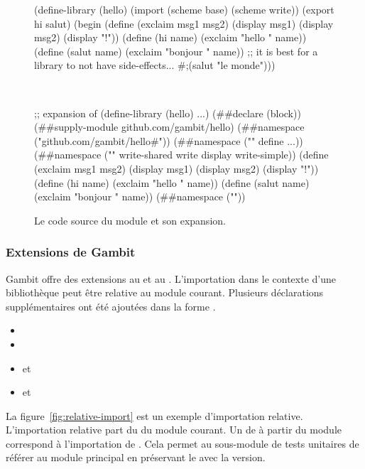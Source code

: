 \begin{figure}[ht]
  \centering
  \fontsize{12}{10}
\begin{mplisting}{0.9}
(define-library (hello)
  (import (scheme base) (scheme write))
  (export hi salut)
  (begin
    (define (exclaim msg1 msg2)
      (display msg1)
      (display msg2)
      (display "!\n"))
    (define (hi name) (exclaim "hello " name))
    (define (salut name) (exclaim "bonjour " name))
    ;; it is best for a library to not have side-effects...
    #;(salut "le monde")))
\end{mplisting}\\[2ex]
\begin{mplisting}{0.9}
;; expansion of (define-library (hello) ...)
(##declare (block))
(##supply-module github.com/gambit/hello)
(##namespace ("github.com/gambit/hello#"))
(##namespace ("" define ...))
(##namespace ("" write-shared write display write-simple))
(define (exclaim msg1 msg2)
    (display msg1) (display msg2) (display "!\n"))
(define (hi name) (exclaim "hello " name))
(define (salut name) (exclaim "bonjour " name))
(##namespace (""))
\end{mplisting}
  \caption{Le code source du module
     et son expansion.}
  \label{fig:define-library->expand}
\end{figure}

\subsubsection{Extensions de Gambit}

Gambit offre des extensions au  et au .
L'importation dans le contexte d'une bibliothèque peut être relative au module
courant. Plusieurs déclarations supplémentaires ont été ajoutées dans la forme
.

\begin{itemize}
  \item {}
  \item {}
  \item {} et 
  \item {} et 
\end{itemize}

La figure~\ref{fig:relative-import} est un exemple d'importation relative.
L'importation relative part du  du module courant.  Un
 de  à partir du module 
correspond à l'importation de . Cela permet au sous-module de
tests unitaires de référer au module principal en préservant le
 avec la version. \\

